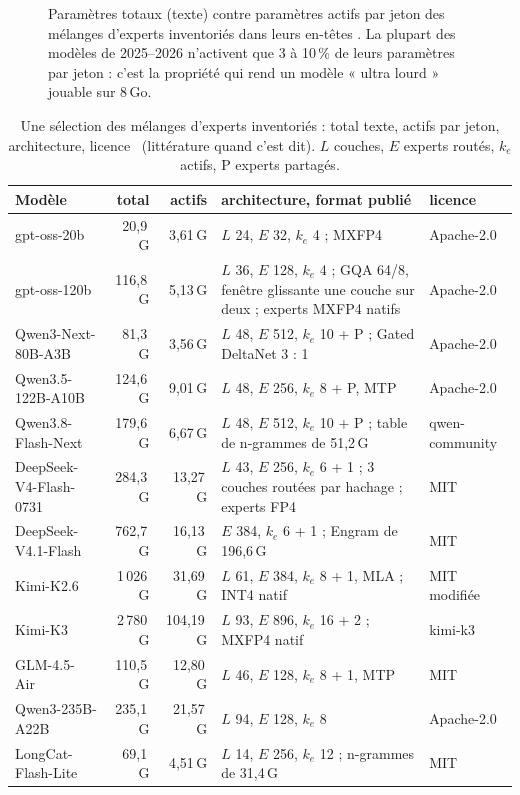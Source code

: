 \begin{figure}[ht]
\centering
\GrapheMoE
\caption[Paramètres totaux et actifs des mélanges d'experts de 2026]{Paramètres totaux (texte) contre paramètres actifs par jeton des mélanges d'experts inventoriés dans leurs en-têtes \mes. La plupart des modèles de 2025--2026 n'activent que 3 à 10\,\% de leurs paramètres par jeton : c'est la propriété qui rend un modèle « ultra lourd » jouable sur 8\,Go.}
\label{fig:moe-inventaire}
\end{figure}

\begin{table}[ht]
\centering\small
\caption[Les mélanges d'experts visés, lus dans leurs en-têtes]{Une sélection des mélanges d'experts inventoriés : total texte, actifs par jeton, architecture, licence \mes~(littérature quand c'est dit). $L$ couches, $E$ experts routés, $k_e$ actifs, P experts partagés.}
\label{tab:moe-inventaire}
\begin{tabularx}{\linewidth}{@{}lrrXl@{}}
\toprule
Modèle & total & actifs & architecture, format publié & licence \\
\midrule
gpt-oss-20b~\cite{gptoss2025} & 20,9\,G & 3,61\,G & $L$ 24, $E$ 32, $k_e$ 4 ; MXFP4 & Apache-2.0 \\
gpt-oss-120b~\cite{gptoss2025} & 116,8\,G & 5,13\,G & $L$ 36, $E$ 128, $k_e$ 4 ; GQA 64/8, fenêtre glissante une couche sur deux ; experts MXFP4 natifs & Apache-2.0 \\
Qwen3-Next-80B-A3B & 81,3\,G & 3,56\,G & $L$ 48, $E$ 512, $k_e$ 10 + P ; Gated DeltaNet 3 : 1 & Apache-2.0 \\
Qwen3.5-122B-A10B & 124,6\,G & 9,01\,G & $L$ 48, $E$ 256, $k_e$ 8 + P, MTP & Apache-2.0 \\
Qwen3.8-Flash-Next & 179,6\,G & 6,67\,G & $L$ 48, $E$ 512, $k_e$ 10 + P ; table de n-grammes de 51,2\,G & qwen-community \\
DeepSeek-V4-Flash-0731~\cite{deepseekv4_2026} & 284,3\,G & 13,27\,G & $L$ 43, $E$ 256, $k_e$ 6 + 1 ; 3 couches routées par hachage ; experts FP4 & MIT \\
DeepSeek-V4.1-Flash & 762,7\,G & 16,13\,G & $E$ 384, $k_e$ 6 + 1 ; Engram de 196,6\,G~\cite{engram2026} & MIT \\
Kimi-K2.6~\cite{kimik2_2025} & 1\,026\,G & 31,69\,G & $L$ 61, $E$ 384, $k_e$ 8 + 1, MLA ; INT4 natif & MIT modifiée \\
Kimi-K3 & 2\,780\,G & 104,19\,G & $L$ 93, $E$ 896, $k_e$ 16 + 2 ; MXFP4 natif & kimi-k3 \\
GLM-4.5-Air~\cite{glm45_2025} & 110,5\,G & 12,80\,G & $L$ 46, $E$ 128, $k_e$ 8 + 1, MTP & MIT \\
Qwen3-235B-A22B~\cite{qwen3_2025} & 235,1\,G & 21,57\,G & $L$ 94, $E$ 128, $k_e$ 8 & Apache-2.0 \\
LongCat-Flash-Lite & 69,1\,G & 4,51\,G & $L$ 14, $E$ 256, $k_e$ 12 ; n-grammes de 31,4\,G & MIT \\
\bottomrule
\end{tabularx}
\end{table}

